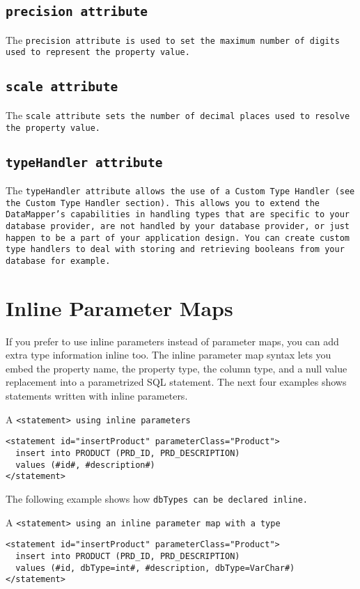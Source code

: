 \subsection{\tt{precision} attribute}
The \tt{precision} attribute is used to set the maximum number of digits used
to represent the property value.

\subsection{\tt{scale} attribute}
The \tt{scale} attribute sets the number of decimal places used to resolve the
property value.

\subsection{\tt{typeHandler} attribute}
The \tt{typeHandler} attribute allows the use of a Custom Type Handler (see
the Custom Type Handler section). This allows you to extend the DataMapper's
capabilities in handling types that are specific to your database provider,
are not handled by your database provider, or just happen to be a part of your
application design. You can create custom type handlers to deal with storing
and retrieving booleans from your database for example.

\section{Inline Parameter Maps}\label{section:3.4.3}
If you prefer to use inline parameters instead of parameter maps, you can add
extra type information inline too. The inline parameter map syntax lets you
embed the property name, the property type, the column type, and a null value
replacement into a parametrized SQL statement. The next four examples shows
statements written with inline parameters.

\begin{example}\label{example:3.18}
 A \tt{<statement>} using inline parameters
\begin{verbatim}
<statement id="insertProduct" parameterClass="Product">
  insert into PRODUCT (PRD_ID, PRD_DESCRIPTION)
  values (#id#, #description#)
</statement>
\end{verbatim}
\end{example}

The following example shows how \tt{dbTypes} can be declared inline.

\begin{example}\label{example:3.19}
 A \tt{<statement>} using an inline parameter map with a type
\begin{verbatim}
<statement id="insertProduct" parameterClass="Product">
  insert into PRODUCT (PRD_ID, PRD_DESCRIPTION)
  values (#id, dbType=int#, #description, dbType=VarChar#)
</statement>
\end{verbatim}
\end{example}


